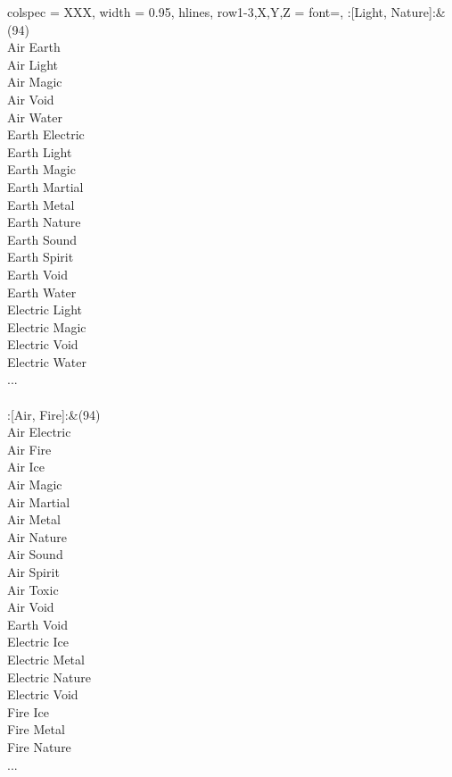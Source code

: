 \begin{longtblr}[
	caption = {2v2 Attacking Effective},
	label = {2v2-Attacking-Effective},
]{
	colspec = {XXX}, width = 0.95\linewidth,
	hlines,
	row{1-3,X,Y,Z} = {font=\bfseries},
}
	:[Light, Nature]:&{(94)\\
	Air Earth \\
	Air Light \\
	Air Magic \\
	Air Void \\
	Air Water \\
	Earth Electric \\
	Earth Light \\
	Earth Magic \\
	Earth Martial \\
	Earth Metal \\
	Earth Nature \\
	Earth Sound \\
	Earth Spirit \\
	Earth Void \\
	Earth Water \\
	Electric Light \\
	Electric Magic \\
	Electric Void \\
	Electric Water \\
	...\\
	}\\

	:[Air, Fire]:&{(94)\\
	Air Electric \\
	Air Fire \\
	Air Ice \\
	Air Magic \\
	Air Martial \\
	Air Metal \\
	Air Nature \\
	Air Sound \\
	Air Spirit \\
	Air Toxic \\
	Air Void \\
	Earth Void \\
	Electric Ice \\
	Electric Metal \\
	Electric Nature \\
	Electric Void \\
	Fire Ice \\
	Fire Metal \\
	Fire Nature \\
	...\\
	}\\


\end{longtblr}
